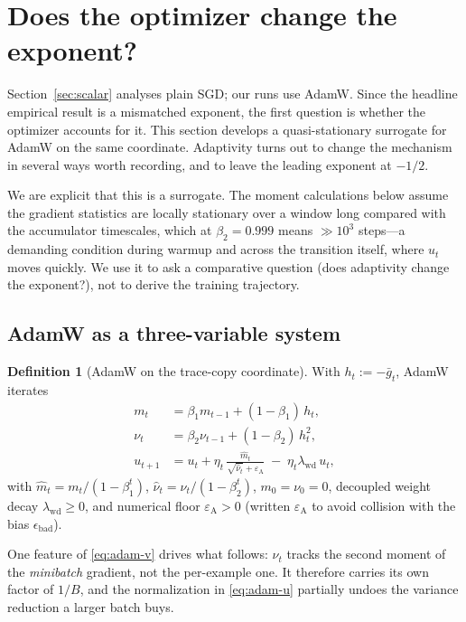 \documentclass{article}
\theoremstyle{plain}
\theoremstyle{definition}
\newtheorem{definition}{Definition}
\theoremstyle{remark}
\newcommand{\1}{\mathbf{1}}
\newcommand{\bad}{\mathrm{bad}}
\newcommand{\wdc}{\mathrm{wd}}
\begin{document}
\section{Does the optimizer change the exponent?}
\label{sec:adam}

Section~\ref{sec:scalar} analyses plain SGD; our runs use AdamW. Since the
headline empirical result is a mismatched exponent, the first question is whether
the optimizer accounts for it. This section develops a quasi-stationary surrogate
for AdamW on the same coordinate. Adaptivity turns out to change the mechanism in
several ways worth recording, and to leave the leading exponent at $-1/2$.

We are explicit that this is a surrogate. The moment calculations below assume
the gradient statistics are locally stationary over a window long compared with
the accumulator timescales, which at $\beta_2 = 0.999$ means $\gg10^3$ steps---a
demanding condition during warmup and across the transition itself, where $u_t$
moves quickly. We use it to ask a comparative question (does adaptivity change
the exponent?), not to derive the training trajectory.

\subsection{AdamW as a three-variable system}

\begin{definition}[AdamW on the trace-copy coordinate]
\label{def:adamw}
With $h_t := -\bar g_t$, AdamW iterates
\begin{align}
m_t &= \beta_1 m_{t-1} + (1-\beta_1)\,h_t, \label{eq:adam-m}\\
\nu_t &= \beta_2 \nu_{t-1} + (1-\beta_2)\,h_t^2, \label{eq:adam-v}\\
u_{t+1} &= u_t + \eta_t\,\frac{\hat m_t}{\sqrt{\hat\nu_t}+\varepsilon_{\mathrm A}}
           \;-\; \eta_t\lambda_\wdc\, u_t ,
\label{eq:adam-u}
\end{align}
with $\hat m_t = m_t/(1-\beta_1^t)$, $\hat\nu_t = \nu_t/(1-\beta_2^t)$,
$m_0 = \nu_0 = 0$, decoupled weight decay $\lambda_\wdc\ge0$, and numerical floor
$\varepsilon_{\mathrm A} > 0$ (written $\varepsilon_{\mathrm A}$ to avoid
collision with the bias $\epsilon_\bad$).
\end{definition}

One feature of \eqref{eq:adam-v} drives what follows: $\nu_t$ tracks the second
moment of the \emph{minibatch} gradient, not the per-example one. It therefore
carries its own factor of $1/B$, and the normalization in \eqref{eq:adam-u}
partially undoes the variance reduction a larger batch buys.
\end{document}
